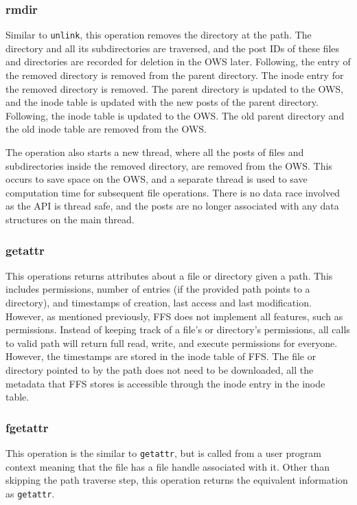 \subsubsection{rmdir}
Similar to \texttt{unlink}, this operation removes the directory at the path. The directory and all its subdirectories are traversed, and the post IDs of these files and directories are recorded for deletion in the OWS later. Following, the entry of the removed directory is removed from the parent directory. The inode entry for the removed directory is removed. The parent directory is updated to the OWS, and the inode table is updated with the new posts of the parent directory. Following, the inode table is updated to the OWS. The old parent directory and the old inode table are removed from the OWS.

The operation also starts a new thread, where all the posts of files and subdirectories inside the removed directory, are removed from the OWS. This occurs to save space on the OWS, and a separate thread is used to save computation time for subsequent file operations. There is no data race involved as the API is thread safe, and the posts are no longer associated with any data structures on the main thread.

\subsubsection{getattr}
This operations returns attributes about a file or directory given a path. This includes permissions, number of entries (if the provided path points to a directory), and timestamps of creation, last access and last modification. However, as mentioned previously, FFS does not implement all features, such as permissions. Instead of keeping track of a file's or directory's permissions, all calls to valid path will return full read, write, and execute permissions for everyone. However, the timestamps are stored in the inode table of FFS. The file or directory pointed to by the path does not need to be downloaded, all the metadata that FFS stores is accessible through the inode entry in the inode table.

\subsubsection{fgetattr}
This operation is the similar to \texttt{getattr}, but is called from a user program context meaning that the file has a file handle associated with it. Other than skipping the path traverse step, this operation returns the equivalent information as \texttt{getattr}.

